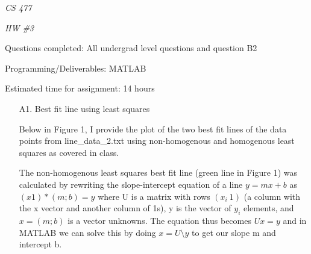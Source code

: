 \documentclass[12pt]{report}
\begin{document}
\centerline{\it CS 477} \centerline{\it HW \#3}

\centerline {Questions completed: All undergrad level questions and question B2}
\centerline {Programming/Deliverables: MATLAB} \centerline {Estimated time for
  assignment: 14 hours}

\begin{enumerate}
  
\item[A1.] Best fit line using least squares
  
  Below in Figure 1, I provide the plot of the two best fit lines of the data
  points from line\_data\_2.txt using non-homogenous and homogenous least
  squares as covered in class.
  \newpage
  \begin{figure}[h!]
    \centering {}
  \end{figure}
  The non-homogenous least squares best fit line (green line in Figure 1) was
  calculated by rewriting the slope-intercept equation of a line $y=mx+b$ as $(x
  1)*(m ; b)=y$ where U is a matrix with rows $(x_i\ 1)$ (a column with the x
  vector and another column of 1s), y is the vector of $y_i$ elements, and $x=(m
  ; b)$ is a vector unknowns. The equation thus becomes $Ux=y$ and in MATLAB we
  can solve this by doing $x=U \setminus y$ to get our slope m and intercept b.
  

\end{enumerate}
\end{document}
